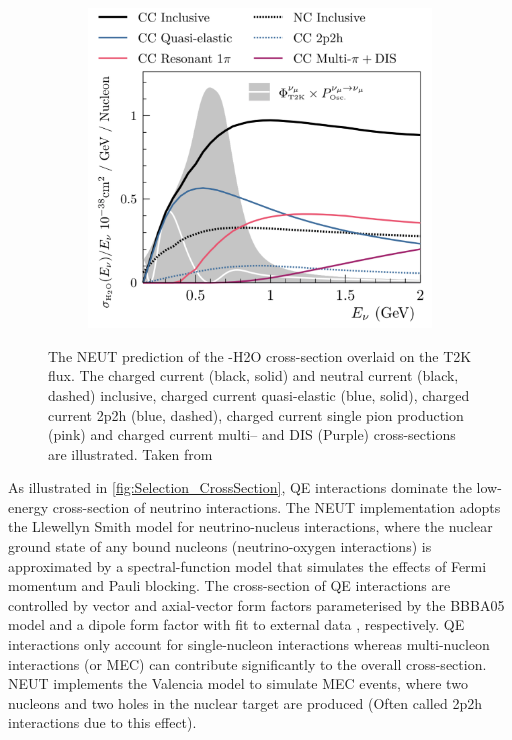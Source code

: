 \begin{figure}[h]
  \begin{subfigure}[t]{0.8\textwidth}
    \includegraphics[width=\textwidth, trim={0mm 0mm 0mm 0mm}, clip,page=1]{Figures/Selections/NEUTCrossSection.pdf}
  \end{subfigure}
  \caption{The NEUT prediction of the \quickmath{\nu_{\mu}}-H2O cross-section overlaid on the T2K \quickmath{\nu_{\mu}} flux. The charged current (black, solid) and neutral current (black, dashed) inclusive, charged current quasi-elastic (blue, solid), charged current 2p2h (blue, dashed), charged current single pion production (pink) and charged current multi--\quickmath{\pi} and DIS (Purple) cross-sections are illustrated. Taken from \cite{Hayato2021}}
  \label{fig:Selection_CrossSection}
\end{figure}

As illustrated in \autoref{fig:Selection_CrossSection}, QE interactions dominate the low-energy cross-section of neutrino interactions. The NEUT implementation adopts the Llewellyn Smith \cite{llewelyn-smith} model for neutrino-nucleus interactions, where the nuclear ground state of any bound nucleons (neutrino-oxygen interactions) is approximated by a spectral-function \cite{Benhar1989} model that simulates the effects of Fermi momentum and Pauli blocking. The cross-section of QE interactions are controlled by vector and axial-vector form factors parameterised by the BBBA05 \cite{bbba05} model and a dipole form factor with  fit to external data \cite{Aguilar_Arevalo_2010}, respectively. QE interactions only account for single-nucleon interactions whereas multi-nucleon interactions (or MEC) can contribute significantly to the overall cross-section. NEUT implements the Valencia \cite{nieves2} model to simulate MEC events, where two nucleons and two holes in the nuclear target are produced (Often called 2p2h interactions due to this effect).

